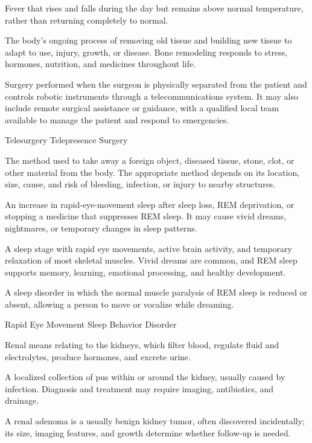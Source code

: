  Fever that rises and falls during the day but remains above normal temperature, rather than returning completely to normal.

 The body's ongoing process of removing old tissue and building new tissue to adapt to use, injury, growth, or disease. Bone remodeling responds to stress, hormones, nutrition, and medicines throughout life.

 Surgery performed when the surgeon is physically separated from the patient and controls robotic instruments through a telecommunications system. It may also include remote surgical assistance or guidance, with a qualified local team available to manage the patient and respond to emergencies.

\synonyms
Telesurgery
Telepresence Surgery

 The method used to take away a foreign object, diseased tissue, stone, clot, or other material from the body. The appropriate method depends on its location, size, cause, and risk of bleeding, infection, or injury to nearby structures.

 An increase in rapid-eye-movement sleep after sleep loss, REM deprivation, or stopping a medicine that suppresses REM sleep. It may cause vivid dreams, nightmares, or temporary changes in sleep patterns.

 A sleep stage with rapid eye movements, active brain activity, and temporary relaxation of most skeletal muscles. Vivid dreams are common, and REM sleep supports memory, learning, emotional processing, and healthy development.

 A sleep disorder in which the normal muscle paralysis of REM sleep is reduced or absent, allowing a person to move or vocalize while dreaming.

\synonyms
Rapid Eye Movement Sleep Behavior Disorder

 Renal means relating to the kidneys, which filter blood, regulate fluid and electrolytes, produce hormones, and excrete urine.

 A localized collection of pus within or around the kidney, usually caused by infection. Diagnosis and treatment may require imaging, antibiotics, and drainage.

 A renal adenoma is a usually benign kidney tumor, often discovered incidentally; its size, imaging features, and growth determine whether follow-up is needed.

